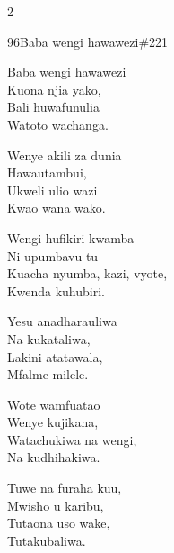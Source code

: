 \begin{multicols}{2}
\begin{hymn}{96}{Baba wengi hawawezi}{\#221}
\begin{stanza}
Baba wengi hawawezi\\
Kuona njia yako,\\
Bali huwafunulia\\
Watoto wachanga.
\end{stanza}
\begin{stanza}
Wenye akili za dunia\\
Hawautambui,\\
Ukweli ulio wazi\\
Kwao wana wako.
\end{stanza}
\begin{stanza}
Wengi hufikiri kwamba\\
Ni upumbavu tu\\
Kuacha nyumba, kazi, vyote,\\
Kwenda kuhubiri.
\end{stanza}
\begin{stanza}
Yesu anadharauliwa\\
Na kukataliwa,\\
Lakini atatawala,\\
Mfalme milele.
\end{stanza}
\begin{stanza}
Wote wamfuatao\\
Wenye kujikana,\\
Watachukiwa na wengi,\\
Na kudhihakiwa.
\end{stanza}
\begin{stanza}
Tuwe na furaha kuu,\\
Mwisho u karibu,\\
Tutaona uso wake,\\
Tutakubaliwa.
\end{stanza}
\end{hymn}


\end{multicols}
